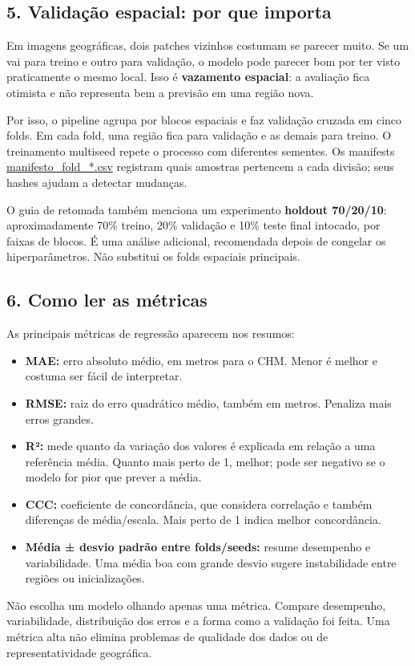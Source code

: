 \documentclass[11pt,a4paper]{article}
\begin{document}
\subsection{5. Validação espacial: por que importa}
Em imagens geográficas, dois patches vizinhos costumam se parecer muito. Se um vai para treino e outro para validação, o modelo pode parecer bom por ter visto praticamente o mesmo local. Isso é \textbf{vazamento espacial}: a avaliação fica otimista e não representa bem a previsão em uma região nova.

Por isso, o pipeline agrupa por blocos espaciais e faz validação cruzada em cinco folds. Em cada fold, uma região fica para validação e as demais para treino. O treinamento multiseed repete o processo com diferentes sementes. Os manifests \url{manifesto_fold_*.csv} registram quais amostras pertencem a cada divisão; seus hashes ajudam a detectar mudanças.

O guia de retomada também menciona um experimento \textbf{holdout 70/20/10}: aproximadamente 70\% treino, 20\% validação e 10\% teste final intocado, por faixas de blocos. É uma análise adicional, recomendada depois de congelar os hiperparâmetros. Não substitui os folds espaciais principais.

\subsection{6. Como ler as métricas}
As principais métricas de regressão aparecem nos resumos:

\begin{itemize}
\item \textbf{MAE:} erro absoluto médio, em metros para o CHM. Menor é melhor e costuma ser fácil de interpretar.
\item \textbf{RMSE:} raiz do erro quadrático médio, também em metros. Penaliza mais erros grandes.
\item \textbf{R²:} mede quanto da variação dos valores é explicada em relação a uma referência média. Quanto mais perto de 1, melhor; pode ser negativo se o modelo for pior que prever a média.
\item \textbf{CCC:} coeficiente de concordância, que considera correlação e também diferenças de média/escala. Mais perto de 1 indica melhor concordância.
\item \textbf{Média ± desvio padrão entre folds/seeds:} resume desempenho e variabilidade. Uma média boa com grande desvio sugere instabilidade entre regiões ou inicializações.
\end{itemize}
Não escolha um modelo olhando apenas uma métrica. Compare desempenho, variabilidade, distribuição dos erros e a forma como a validação foi feita. Uma métrica alta não elimina problemas de qualidade dos dados ou de representatividade geográfica.
\end{document}

